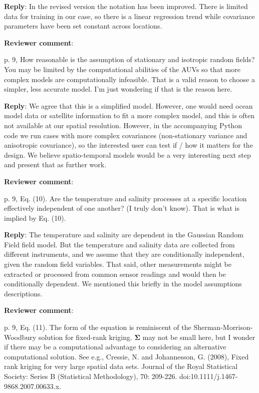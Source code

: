 \documentclass[a4paper]{article}
\newcommand{\bSigma}{ {\boldsymbol \Sigma} }
\def\revcom{\textbf{Reviewer comment}}
\def\reply{\textbf{Reply}}
\begin{document}
\begin{answers}
\reply: In the revised version the notation has been improved. There is limited data for training in our case, so there is a linear regression trend while covariance parameters have been set constant across locations.

\item{\revcom :}\label{r2c3}

p. 9, How reasonable is the assumption of stationary and isotropic random fields? You may be limited by the computational abilities of the AUVs so that more complex models are computationally infeasible. That is a valid reason to choose a simpler, less accurate model. I’m just wondering if that is the reason here. 

\reply: We agree that this is a simplified model. However, one would need ocean model data or satellite information to fit a more complex model, and this is often not available at our spatial resolution. However, in the accompanying Python code we run cases with more complex covariances (non-stationary variance and anisotropic covariance), so the interested user can test if / how it matters for the design. We believe spatio-temporal models would be a very interesting next step and present that as further work.

\item{\revcom  :}\label{r2c4}

p. 9, Eq. (10). Are the temperature and salinity processes at a specific location effectively independent of one another? (I truly don’t know). That is what is implied by Eq. (10).

\reply: The temperature and salinity are dependent in the Gaussian Random Field field model. But the temperature and salinity data are collected from different instruments, and we assume that they are conditionally independent, given the random field variables. That said, other measurements might be extracted or processed from common sensor readings and would then be conditionally dependent. We mentioned this briefly in the model assumptions descriptions.

\item{\revcom :}\label{r2c5}

p. 9, Eq. (11). The form of the equation is reminiscent of the Sherman-Morrison-Woodbury solution for fixed-rank kriging. $\bSigma$ may not be small here, but I wonder if there may be a computational advantage to considering an alternative computational solution.  See e.g., Cressie, N. and Johannesson, G. (2008), Fixed rank kriging for very large spatial data sets. Journal of the Royal Statistical Society: Series B (Statistical Methodology), 70: 209-226. doi:10.1111/j.1467-9868.2007.00633.x.


\end{answers}
\end{document}
